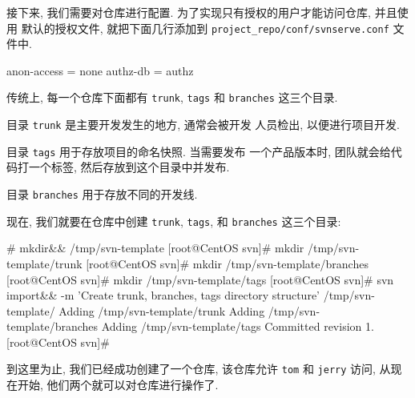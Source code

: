 \documentclass[nofonts, oneside]{ctexbook}
\begin{document}
接下来, 我们需要对仓库进行配置. 为了实现只有授权的用户才能访问仓库, 并且使用
默认的授权文件, 就把下面几行添加到
\texttt{project\_repo/conf/svnserve.conf}
文件中.
\begin{svnshell}
anon-access = none
authz-db = authz
\end{svnshell}

传统上, 每一个仓库下面都有 \texttt{trunk}, \texttt{tags} 和 \texttt{branches}
这三个目录.

目录 \texttt{trunk} 是主要开发发生的地方, 通常会被开发
人员检出, 以便进行项目开发.

目录 \texttt{tags} 用于存放项目的命名快照. 当需要发布
一个产品版本时, 团队就会给代码打一个标签, 然后存放到这个目录中并发布.

目录 \texttt{branches} 用于存放不同的开发线.

现在, 我们就要在仓库中创建 \texttt{trunk}, \texttt{tags}, 和 \texttt{branches}
这三个目录:
\begin{svnshell}
# mkdir&& /tmp/svn-template
[root@CentOS svn]# mkdir /tmp/svn-template/trunk
[root@CentOS svn]# mkdir /tmp/svn-template/branches
[root@CentOS svn]# mkdir /tmp/svn-template/tags
[root@CentOS svn]# svn import&& -m 'Create trunk, branches, tags directory structure' /tmp/svn-template/
Adding              /tmp/svn-template/trunk
Adding              /tmp/svn-template/branches
Adding              /tmp/svn-template/tags
Committed revision 1.
[root@CentOS svn]#
\end{svnshell}

到这里为止, 我们已经成功创建了一个仓库, 该仓库允许 \texttt{tom} 和
\texttt{jerry} 访问, 从现在开始, 他们两个就可以对仓库进行操作了.

\printindex
\end{document}
